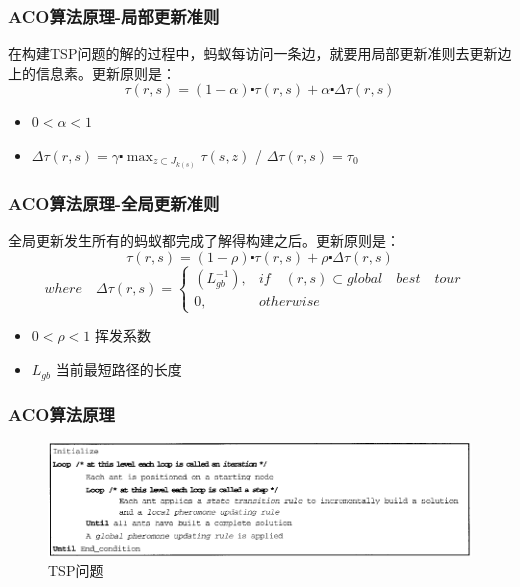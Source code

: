 \begin{frame}
	\frametitle{ACO算法原理-局部更新准则}
	在构建TSP问题的解的过程中，蚂蚁每访问一条边，就要用局部更新准则去更新边上的信息素。更新原则是：
	\Large{$$\tau(r,s) = (1-\alpha)\centerdot\tau(r,s)+\alpha\centerdot\Delta\tau(r,s)$$}
	\begin{itemize}
			\item{$0<\alpha<1$ }
			\item{$\Delta\tau(r,s) = \gamma\centerdot\max_{z\subset J_{k(s)}}\tau(s,z)$ /
					$\Delta\tau(r,s) = \tau_0$}
		\end{itemize}
\end{frame}


\begin{frame}
	\frametitle{ACO算法原理-全局更新准则}
	全局更新发生所有的蚂蚁都完成了解得构建之后。更新原则是：
	\Large $$\tau(r,s) = (1-\rho)\centerdot\tau(r,s)+\rho\centerdot\Delta\tau(r,s)$$
	$$ where\quad
	\Delta\tau(r,s) =
	\begin{cases}
	(L_{gb}^{-1}),  & \text{$if\quad (r,s) \subset global\quad best\quad tour$ } \\
	0, & \text{$otherwise$}
	\end{cases}
	$$
	\begin{itemize}
			\item{$0<\rho<1$ \normalsize{挥发系数}}
			\item{$L_{gb}$ \normalsize{当前最短路径的长度}}
		\end{itemize}
\end{frame}


\begin{frame}
	\frametitle{ACO算法原理}
	\begin{figure}[htbp]
		\centering
		\includegraphics[width=13cm]{pic/ant4.png}
		\caption{TSP问题}
	\end{figure}
\end{frame}


